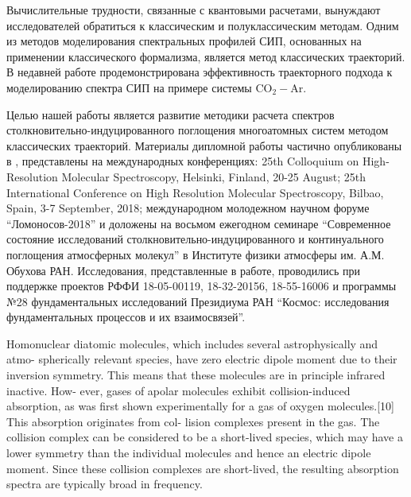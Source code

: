 Вычислительные трудности, связанные с квантовыми расчетами, вынуждают исследователей обратиться к классическим и полуклассическим методам. Одним из методов моделирования спектральных профилей СИП, основанных на применении классического формализма, является метод классических траекторий. В недавней работе \cite{oparin2017} продемонстрирована эффективность траекторного подхода к моделированию спектра СИП на примере системы CO$_2-$Ar. \par
Целью нашей работы является развитие методики расчета спектров столкновительно-индуцированного поглощения многоатомных систем методом классических траекторий. Материалы дипломной работы частично опубликованы в \cite{chistikov2018}, представлены на международных конференциях: 25th Colloquium on High-Resolution Molecular Spectroscopy, Helsinki, Finland, 20-25 August; 25th International Conference on High Resolution Molecular Spectroscopy, Bilbao, Spain, 3-7 September, 2018; международном молодежном научном форуме \enquote{Ломоносов-2018} и доложены на восьмом ежегодном семинаре \enquote{Современное состояние исследований столкновительно-индуцированного и континуального поглощения атмосферных молекул} в Институте физики атмосферы им. А.М. Обухова РАН. Исследования, представленные в работе, проводились при поддержке проектов РФФИ 18-05-00119, 18-32-20156, 18-55-16006 и программы №28 фундаментальных исследований Президиума РАН \enquote{Космос: исследования фундаментальных процессов и их взаимосвязей}.  

\iffalse
Homonuclear diatomic molecules, which includes several astrophysically and atmo-
spherically relevant species, have zero electric dipole moment due to their inversion
symmetry. This means that these molecules are in principle infrared inactive. How-
ever, gases of apolar molecules exhibit collision-induced absorption, as was first shown
experimentally for a gas of oxygen molecules.[10] This absorption originates from col-
lision complexes present in the gas. The collision complex can be considered to be a
short-lived species, which may have a lower symmetry than the individual molecules
and hence an electric dipole moment. Since these collision complexes are short-lived,
the resulting absorption spectra are typically broad in frequency.

